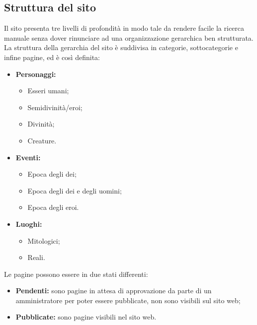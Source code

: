 \subsection{Struttura del sito}
Il sito presenta tre livelli di profondità in modo tale da rendere facile la ricerca manuale senza dover rinunciare ad una organizzazione gerarchica ben strutturata.\\
La struttura della gerarchia del sito è suddivisa in categorie, sottocategorie e infine pagine, ed è così definita:
\begin{itemize}
	\item \textbf{Personaggi:}
	\begin{itemize}
		\item Esseri umani;
		\item Semidivinità/eroi;
		\item Divinità;
		\item Creature.
	\end{itemize}
	\item \textbf{Eventi:}
	\begin{itemize}
		\item Epoca degli dei;
		\item Epoca degli dei e degli uomini;
		\item Epoca degli eroi.
	\end{itemize}
	\item \textbf{Luoghi:}
	\begin{itemize}
		\item Mitologici;
		\item Reali.
	\end{itemize}
\end{itemize}
Le pagine possono essere in due stati differenti:
\begin{itemize}
	\item \textbf{Pendenti:} sono pagine in attesa di approvazione da parte di un amministratore per poter essere pubblicate, non sono visibili sul sito web;
	\item \textbf{Pubblicate:} sono pagine visibili nel sito web.
\end{itemize}

